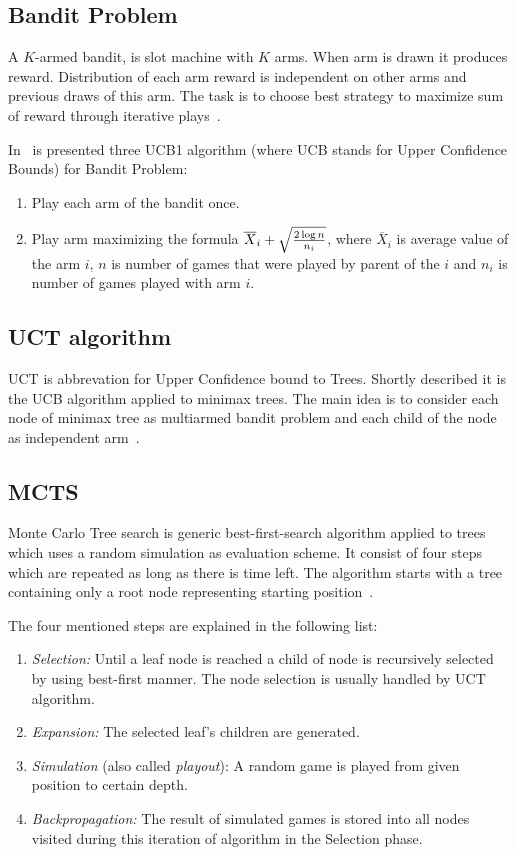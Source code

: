 \subsection{Bandit Problem}
A $K$-armed bandit, is slot machine with $K$ arms. When arm is drawn it
produces reward. Distribution of each arm reward is independent on other arms
and previous draws of this arm. The task is to choose best strategy to maximize
sum of reward through iterative plays~\cite{MoGo,MultiarmedBandit}.

In~\cite{MultiarmedBandit} is presented three UCB1 algorithm (where UCB stands for Upper Confidence Bounds) for Bandit Problem:

\begin{enumerate}
\item Play each arm of the bandit once.
\item Play arm maximizing the formula $\overline X_i + \sqrt{2 \log n \over n_i}$,
	  where $\overline X_i$ is average value of the arm $i$, $n$ is number
	  of games that were played by parent of the $i$ and $n_i$ is number of
	  games played with arm $i$.
\end{enumerate}


\subsection{UCT algorithm}
UCT is abbrevation for  Upper Confidence bound to Trees. Shortly described it
is the UCB algorithm applied to minimax trees. The main idea is to consider
each node of minimax tree as multiarmed bandit problem and each child of the
node as independent arm~\cite{MoGo}.


\subsection{MCTS}
Monte Carlo Tree search is generic best-first-search algorithm applied to
trees which uses a random simulation as evaluation scheme. It consist of four
steps which are repeated as long as there is time left. The algorithm starts
with a tree containing only a root node representing starting
position~\cite{progressive-strategies,KOZELEK}.

The four mentioned steps are explained in the following list:

\begin{enumerate}
\item \emph{Selection:} Until a leaf node is reached a child of node is
recursively selected by using best-first manner. The node selection is usually
handled by UCT algorithm.
\item \emph{Expansion:} The selected leaf's children are generated.
\item \emph{Simulation} (also called \emph{playout}): A random game is played
from given position to certain depth.
\item \emph{Backpropagation:} The result of simulated games is stored into all
nodes visited during this iteration of algorithm in the Selection phase.
\end{enumerate}

